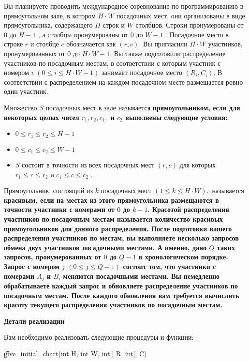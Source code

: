 Вы планируете проводить международное соревнование по программированию в прямоугольном зале, в котором $ H \cdot W $ посадочных мест, они организованы в виде прямоугольника, содержащего $ H $ строк и $ W $ столбцов. Строки пронумерованы от $ 0 $ до $ H-1 $ , а столбцы пронумерованы от $ 0 $ до $ W-1 $ . Посадочное место в строке $ r $ и столбце $ c $ обозначается как $(r, c).$ Вы пригласили $ H \cdot W $ участников, пронумерованных от $ 0 $ до $ H \cdot W-1 . $ Вы также подготовили распределение участников по посадочным местам, в соответствии с которым участник с номером $ i $ $( 0 \le i \le H \cdot W-1 ) $ занимает посадочное место $ (R_i, C_i). $ В соответствии с распределением на каждом посадочном месте размещается ровно один участник. 

Множество $ S $ посадочных мест в зале называется \bf{прямоугольником}, если для некоторых целых чисел $ r_1, r_2, c_1, $ и $ c_2 $ выполнены следующие условия:

\begin{itemize}
\item $ 0 \le r_1 \le r_2 \le H-1 $ 
\item $ 0 \le c_1 \le c_2 \le W-1 $ 
\item $ S $ состоит в точности из всех посадочных мест $ (r, c) $ для которых $ r_1 \le r \le r_2 $ и $ c_1 \le c \le c_2 $ . 
\end{itemize}

Прямоугольник, состоящий из $ k $ посадочных мест $ ( 1 \le k \le H \cdot W), $ называется \bf{красивым}, если на местах из этого прямоугольника размещаются в точности участники с номерами от $ 0 $ до $ k-1. $ \bf{Красотой} распределения участников по посадочным местам называется количество красивых прямоугольников для данного распределения.
После подготовки вашего распределения участников по местам, вы выполняете несколько запросов обмена двух участников посадочными местами. А именно, дано $ Q $ таких запросов, пронумерованных от $ 0 $ до $ Q-1 $ в хронологическом порядке. Запрос с номером $j$ $(0 \le j \le Q-1)$ состоит том, что участники с номерами $ A_j $ и $ B_i $ меняются посадочными местами. Вы немедленно обрабатываете каждый запрос и обновляете распределение участников по посадочным местам. После каждого обновления вам требуется вычислить красоту текущего распределения участников по посадочным местам.

\bf{Детали реализации}

Вам необходимо реализовать следующие процедуры и функции:

\t{give_initial_chart(int H, int W, int[] R, int[] C)}

